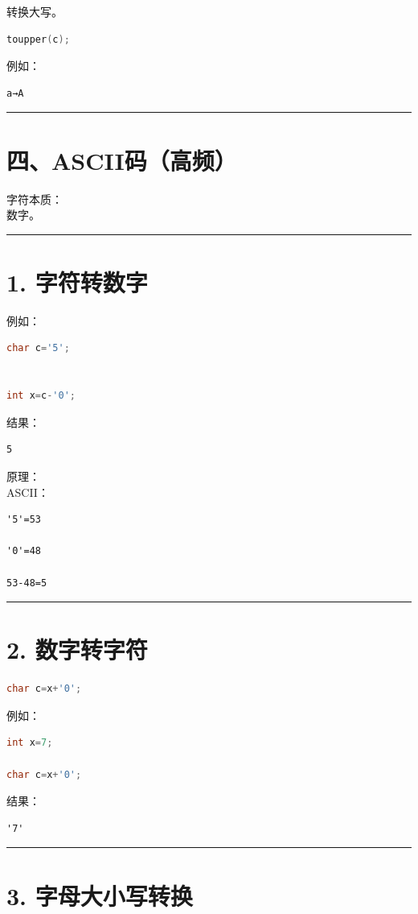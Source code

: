\documentclass[9pt,twocolumn]{extarticle}
\begin{document}
转换大写。
\begin{lstlisting}[language=C++]
toupper(c);
\end{lstlisting}
例如：
\begin{lstlisting}
a→A
\end{lstlisting}

\noindent\rule{\linewidth}{0.4pt}

\section{四、ASCII码（高频）}

字符本质：\\
数字。

\noindent\rule{\linewidth}{0.4pt}

\section{1. 字符转数字}

例如：
\begin{lstlisting}[language=C++]
char c='5';


int x=c-'0';
\end{lstlisting}
结果：
\begin{lstlisting}
5
\end{lstlisting}
原理：\\
ASCII：
\begin{lstlisting}
'5'=53

'0'=48

53-48=5
\end{lstlisting}

\noindent\rule{\linewidth}{0.4pt}

\section{2. 数字转字符}
\begin{lstlisting}[language=C++]
char c=x+'0';
\end{lstlisting}
例如：
\begin{lstlisting}[language=C++]
int x=7;

char c=x+'0';
\end{lstlisting}
结果：
\begin{lstlisting}
'7'
\end{lstlisting}

\noindent\rule{\linewidth}{0.4pt}

\section{3. 字母大小写转换}
\end{document}
